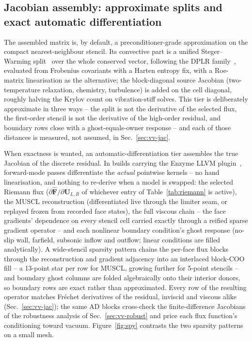 \documentclass[journal,biblatex]{new-aiaa}
\newcommand{\U}{\mathbf{U}}
\begin{document}
\subsection{Jacobian assembly: approximate splits and exact automatic differentiation}
\label{sec:jacobian}

The assembled matrix is, by default, a preconditioner-grade approximation on the compact nearest-neighbour stencil. Its convective part is a unified Steger--Warming split~\cite{steger_flux_1981} over the whole conserved vector, following the DPLR family~\cite{maccormack_solution_1989,wright_data-parallel_1998}, evaluated from Frobenius covariants with a Harten entropy fix, with a Roe-matrix linearisation as the alternative; the block-diagonal source Jacobian (two-temperature relaxation, chemistry, turbulence) is added on the cell diagonal, roughly halving the Krylov count on vibration-stiff solves. This tier is deliberately approximate in three ways -- the split is not the derivative of the selected flux, the first-order stencil is not the derivative of the high-order residual, and boundary rows close with a ghost-equals-owner response -- and each of those distances is measured, not assumed, in Sec.~\ref{sec:vv-jac}.

When exactness is wanted, an automatic-differentiation tier assembles the true Jacobian of the discrete residual. In builds carrying the Enzyme LLVM plugin~\cite{moses_instead_2020, moses_reverse-mode_2021, moses_scalable_2022}, forward-mode passes differentiate the \emph{actual} pointwise kernels -- no hand linearisation, and nothing to re-derive when a model is swapped: the selected Riemann flux ($\partial\hat{\mathbf{F}}/\partial\U_{L,R}$ of whichever entry of Table~\ref{tab:riemann} is active), the MUSCL reconstruction (differentiated live through the limiter seam, or replayed frozen from recorded face states), the full viscous chain -- the face gradients' dependence on every stencil cell carried exactly through a reified sparse gradient operator -- and each nonlinear boundary condition's ghost response (no-slip wall, farfield, subsonic inflow and outflow; linear conditions are filled analytically). A wide-stencil sparsity pattern chains the per-face flux blocks through the reconstruction and gradient adjacency into an interlaced block-COO fill -- a 13-point star per row for MUSCL, growing further for 5-point stencils -- and boundary ghost columns are folded algebraically onto their interior donors, so boundary rows are exact rather than approximated. Every row of the resulting operator matches Fr\'echet derivatives of the residual, inviscid and viscous alike (Sec.~\ref{sec:vv-jac}); the same AD blocks cross-check the finite-difference Jacobians of the robustness analysis of Sec.~\ref{sec:vv-robust} and price each flux function's conditioning toward vacuum. Figure~\ref{fig:spy} contrasts the two sparsity patterns on a small mesh.
\end{document}
